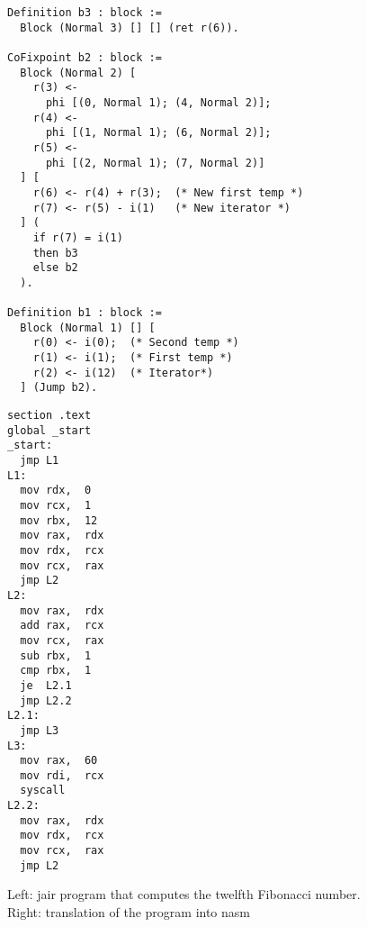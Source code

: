 \begin{figure}[ht]
\begin{minipage}{0.68\linewidth}
\centering
\begin{lstlisting}[style=Rocq]
Definition b3 : block :=
  Block (Normal 3) [] [] (ret r(6)).

CoFixpoint b2 : block :=
  Block (Normal 2) [
    r(3) <-
      phi [(0, Normal 1); (4, Normal 2)];
    r(4) <-
      phi [(1, Normal 1); (6, Normal 2)];
    r(5) <-
      phi [(2, Normal 1); (7, Normal 2)]
  ] [
    r(6) <- r(4) + r(3);  (* New first temp *)
    r(7) <- r(5) - i(1)   (* New iterator *)
  ] (
    if r(7) = i(1)
    then b3
    else b2
  ).

Definition b1 : block :=
  Block (Normal 1) [] [
    r(0) <- i(0);  (* Second temp *)
    r(1) <- i(1);  (* First temp *)
    r(2) <- i(12)  (* Iterator*)
  ] (Jump b2).
\end{lstlisting}
\end{minipage}
\hfill
\begin{minipage}{0.28\linewidth}
\centering
\begin{lstlisting}[style=NASM]
section .text
global _start
_start:
  jmp L1
L1:
  mov rdx,  0
  mov rcx,  1
  mov rbx,  12
  mov rax,  rdx
  mov rdx,  rcx
  mov rcx,  rax
  jmp L2
L2:
  mov rax,  rdx
  add rax,  rcx
  mov rcx,  rax
  sub rbx,  1
  cmp rbx,  1
  je  L2.1
  jmp L2.2
L2.1:
  jmp L3
L3:
  mov rax,  60
  mov rdi,  rcx
  syscall
L2.2:
  mov rax,  rdx
  mov rdx,  rcx
  mov rcx,  rax
  jmp L2
\end{lstlisting}
\end{minipage}
\caption{Left: \gls{jair} program that computes the twelfth Fibonacci number. Right: translation of the program into \gls{nasm}}
\label{fig:ex3}
\end{figure}